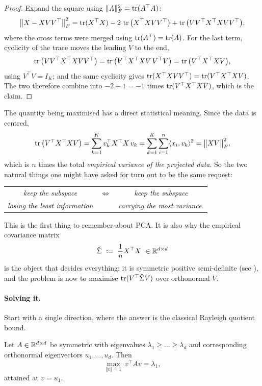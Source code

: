 \begin{proof}
Expand the square using $\Vert A \Vert_F^2 = \operatorname{tr}(A^\top A)$:
\[
\big\Vert X - X V V^\top \big\Vert_F^2
= \operatorname{tr}(X^\top X) - 2\, \operatorname{tr}\big( X^\top X V V^\top \big)
+ \operatorname{tr}\big( V V^\top X^\top X V V^\top \big) ,
\]
where the cross terms were merged using $\operatorname{tr}(A^\top) = \operatorname{tr}(A)$. For the last term,
cyclicity of the trace moves the leading $V$ to the end,
\[
\operatorname{tr}\big( V V^\top X^\top X V V^\top \big) = \operatorname{tr}\big( V^\top X^\top X V \, V^\top V \big)
= \operatorname{tr}\big( V^\top X^\top X V \big) ,
\]
using $V^\top V = I_K$; and the same cyclicity gives $\operatorname{tr}(X^\top X V V^\top) =
\operatorname{tr}(V^\top X^\top X V)$. The two therefore combine into $-2 + 1 = -1$ times
$\operatorname{tr}(V^\top X^\top X V)$, which is the claim.
\end{proof}

The quantity being maximised has a direct statistical meaning. Since the data is
centred,
\[
\operatorname{tr}\big( V^\top X^\top X V \big) = \sum_{k=1}^K v_k^\top X^\top X\, v_k
= \sum_{k=1}^K \sum_{i=1}^n \langle x_i, v_k \rangle^2
= \big\Vert X V \big\Vert_F^2 ,
\]
which is $n$ times the total \emph{empirical variance of the projected data}. So the
two natural things one might have asked for turn out to be the same request:

\begin{center}
\begin{tabular}{@{}c@{\quad}c@{\quad}c@{}}
\emph{keep the subspace} & $\Longleftrightarrow$ & \emph{keep the subspace} \\
\emph{losing the least information} & & \emph{carrying the most variance.}
\end{tabular}
\end{center}

\noindent
This is the first thing to remember about PCA. It is also why the empirical covariance
matrix
\[
\hat \Sigma \ \coloneqq \ \frac{1}{n} X^\top X \ \in \R^{d \times d}
\]
is the object that decides everything: it is symmetric positive semi-definite (see
), and the problem is now to maximise $\operatorname{tr}(V^\top \hat\Sigma
V)$ over orthonormal $V$.

\paragraph{Solving it.}
Start with a single direction, where the answer is the classical Rayleigh quotient
bound.

\begin{lemma}
\label{lem:rayleigh}
Let $A \in \mathbb{R}^{d \times d}$ be symmetric with eigenvalues $\lambda_1 \geq \dots \geq
\lambda_d$ and corresponding orthonormal eigenvectors $u_1, \dots, u_d$. Then
\[
\max_{\Vert v \Vert = 1} \ v^\top A v = \lambda_1 ,
\]
attained at $v = u_1$.
\end{lemma}

